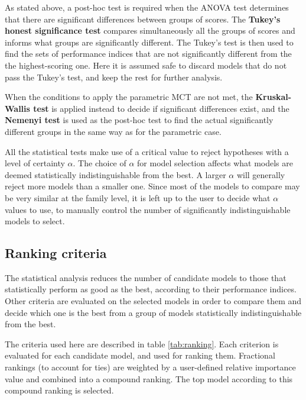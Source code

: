 As stated above, a post-hoc test is required when the ANOVA test determines that there are
significant differences between groups of scores. The {\bf Tukey's honest significance test} compares
simultaneously all the groups of scores and informs what groups are significantly different. The
Tukey's test is then used to find the sets of performance indices that are not significantly
different from the the highest-scoring one. Here it is assumed safe to discard models that do not
pass the Tukey's test, and keep the rest for further analysis.

When the conditions to apply the parametric MCT are not met, the {\bf Kruskal-Wallis test} is
applied instead to decide if significant differences exist, and the {\bf Nemenyi test} is used as
the post-hoc test to find the actual significantly different groups in the same way as for the
parametric case.

All the statistical tests make use of a critical value to reject hypotheses with a level of
certainty $\alpha$. The choice of $\alpha$ for model selection affects what models are deemed
statistically indistinguishable from the best. A larger $\alpha$ will generally reject more models
than a smaller one. Since most of the models to compare may be very similar at the family level,
it is left up to the user to decide what $\alpha$ values to use, to manually control the number of
significantly indistinguishable models to select.

\subsection{Ranking criteria}
The statistical analysis reduces the number of candidate models to those that statistically perform
as good as the best, according to their performance indices. Other criteria are evaluated on the
selected models in order to compare them and decide which one is the best from a group of models
statistically indistinguishable from the best.

The criteria used here are described in table \ref{tab:ranking}. Each criterion is evaluated for each
candidate model, and used for ranking them. Fractional rankings (to account for ties) are weighted by
a user-defined relative importance value and combined into a compound ranking. The top model
according to this compound ranking is selected.

